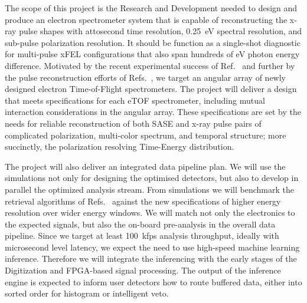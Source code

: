 The scope of this project is the Research and Development needed to design and produce an electron spectrometer system that is capable of reconstructing the x-ray pulse shapes with attosecond time resolution, 0.25~eV spectral resolution, and sub-pulse polarization resolution.
It should be function as a single-shot diagnostic for multi-pulse xFEL configurations that also span hundreds of eV photon energy difference.
Motivated by the recent experimental success of Ref.~\cite{Nick2018} and further by the pulse reconstruction efforts of Refs.~\cite{Siqi2018,Feurer2018}, we target an angular array of newly designed electron Time-of-Flight spectrometers.  
The project will deliver a design that meets specifications for each eTOF spectrometer, including mutual interaction considerations in the angular array.
These specifications are set by the needs for reliable reconstruction of both SASE and x-ray pulse pairs of complicated polarization, multi-color spectrum, and temporal structure; more succinctly, the polarization resolving Time-Energy distribution.

The project will also deliver an integrated data pipeline plan.
We will use the simulations not only for designing the optimised detectors, but also to develop in parallel the optimized analysis stream.  
From simulations we will benchmark the retrieval algorithms of Refs.~\cite{Nick2018,Siqi2018,Feurer2018} against the new specifications of higher energy resolution over wider energy windows.
We will match not only the electronics to the expected signals, but also the on-board pre-analysis in the overall data pipeline.
Since we target at least 100~kfps analysis throughput, ideally with microsecond level latency, we expect the need to use high-speed machine learning inference.
Therefore we will integrate the inferencing with the early stages of the Digitization and FPGA-based signal processing.
The output of the inference engine is expected to inform user detectors how to route buffered data, either into sorted order for histogram or intelligent veto.



